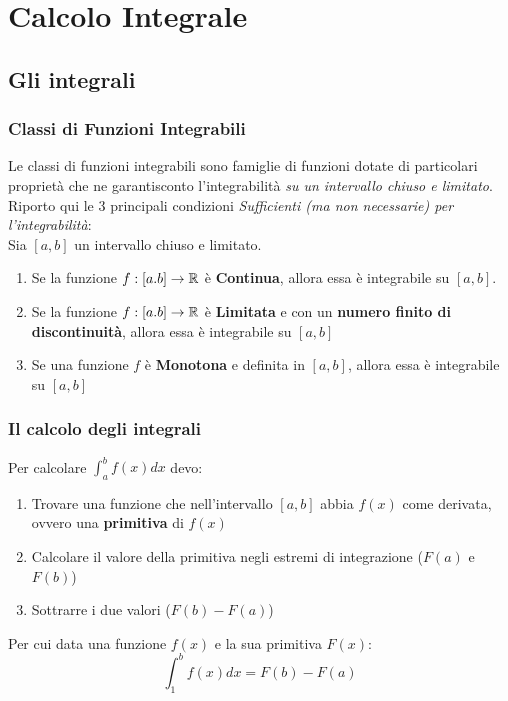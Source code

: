\chapter{Calcolo Integrale}

\section{Gli integrali}


\subsection{Classi di Funzioni Integrabili}
Le classi di funzioni integrabili sono famiglie di funzioni dotate di particolari proprietà che ne garantisconto l'integrabilità \emph{su un intervallo chiuso e limitato}.
Riporto qui le 3 principali condizioni \emph{Sufficienti (ma non necessarie) per l'integrabilità}:
\\Sia $[a,b]$ un intervallo chiuso e limitato.
\begin{enumerate}
	\item Se la funzione $f:[a.b] \to \mathbb{R}$ è \textbf{Continua}, allora essa è integrabile su $[a,b]$.
	\item Se la funzione $f:[a.b] \to \mathbb{R}$ è \textbf{Limitata} e con un \textbf{numero finito di discontinuità}, allora essa è integrabile su $[a,b]$
	\item Se una funzione $f$ è \textbf{Monotona} e definita in $[a,b]$, allora essa è integrabile su $[a,b]$ 
\end{enumerate}

\subsection{Il calcolo degli integrali}
Per calcolare $\int_{a}^{b} f(x) dx$ devo:
\begin{enumerate}
	\item Trovare una funzione che nell'intervallo $[a,b]$ abbia $f(x)$ come derivata, ovvero una \textbf{primitiva} di $f(x)$
	\item Calcolare il valore della primitiva negli estremi di integrazione ($F(a)$ e $F(b)$)
	\item Sottrarre i due valori ($F(b)-F(a)$)
\end{enumerate}
Per cui data una funzione $f(x)$ e la sua primitiva $F(x)$: $$\int_{1}^{b} f(x)dx = F(b)- F(a)$$

